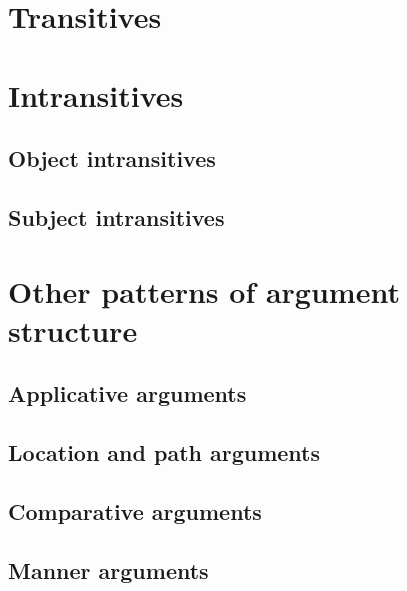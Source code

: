 \section{Transitives}\label{sec:argstr-trans}


\section{Intransitives}\label{sec:argstr-intrans}

\subsection{Object intransitives}\label{sec:argstr-intrans-obj}

\subsection{Subject intransitives}\label{sec:argstr-intrans-subj}

\section{Other patterns of argument structure}\label{sec:argstr-other}

\subsection{Applicative arguments}\label{sec:argstr-other-appl}

\subsection{Location and path arguments}\label{sec:argstr-other-locpath}

\subsection{Comparative arguments}\label{sec:argstr-other-cmpv}

\subsection{Manner arguments}\label{sec:argstr-other-manner}

\stopcontents[chapters]
